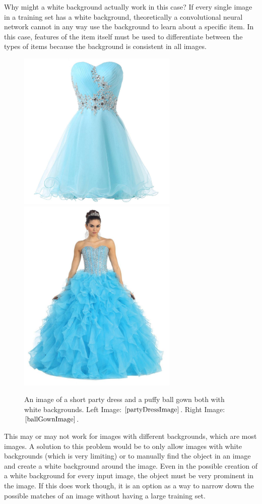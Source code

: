 \documentclass[12pt]{report} %
\begin{document}
	Why might a white background actually work in this case? If every single image in a training set has a white background, theoretically a convolutional neural network cannot in any way use the background to learn about a specific item. In this case, features of the item itself must be used to differentiate between the types of items because the background is consistent in all images.
\begin{figure}
\centering
\includegraphics[width=3in]{short_party_dress}
\includegraphics[width=3in]{ball_gown}
\caption[Images of Dresses with White Backgrounds]
	{An image of a short party dress and a puffy ball gown both with white backgrounds. Left Image: $\cite{partyDressImage}$. Right Image:  $\cite{ballGownImage}$.}
\end{figure}		

	This may or may not work for images with different backgrounds, which are most images. A solution to this problem would be to only allow images with white backgrounds (which is very limiting) or to manually find the object in an image and create a white background around the image. Even in the possible creation of a white background for every input image, the object must be very prominent in the image.  If this does work though, it is an option as a way to narrow down the possible matches of an image without having a large training set.
	
\end{document}

